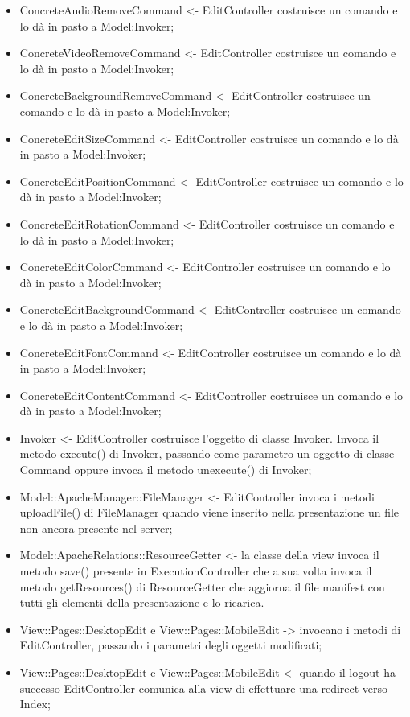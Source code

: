 {{\begin{itemize}
			\item ConcreteAudioRemoveCommand <- EditController costruisce un comando e lo dà in pasto a Model:Invoker;
			\item ConcreteVideoRemoveCommand <- EditController costruisce un comando e lo dà in pasto a Model:Invoker;
			\item ConcreteBackgroundRemoveCommand <- EditController costruisce un comando e lo dà in pasto a Model:Invoker;
			\item ConcreteEditSizeCommand <- EditController costruisce un comando e lo dà in pasto a Model:Invoker;
			\item ConcreteEditPositionCommand <- EditController costruisce un comando e lo dà in pasto a Model:Invoker;
			\item ConcreteEditRotationCommand <- EditController costruisce un comando e lo dà in pasto a Model:Invoker;
			\item ConcreteEditColorCommand <- EditController costruisce un comando e lo dà in pasto a Model:Invoker;
			\item ConcreteEditBackgroundCommand <- EditController costruisce un comando e lo dà in pasto a Model:Invoker;
			\item ConcreteEditFontCommand <- EditController costruisce un comando e lo dà in pasto a Model:Invoker;
			\item ConcreteEditContentCommand <- EditController costruisce un comando e lo dà in pasto a Model:Invoker;
			\item Invoker <- EditController costruisce l’oggetto di classe Invoker. Invoca il metodo execute() di Invoker, passando come parametro un oggetto di classe Command oppure invoca il metodo unexecute() di Invoker;
			\item Model::ApacheManager::FileManager <- EditController invoca i metodi uploadFile() di FileManager quando viene inserito nella presentazione un file non ancora presente nel server;
			\item Model::ApacheRelations::ResourceGetter <- la classe della view invoca il metodo save() presente in  ExecutionController che a sua volta invoca il metodo getResources() di ResourceGetter che aggiorna il file manifest con tutti gli elementi della presentazione e lo ricarica.
			\item View::Pages::DesktopEdit e View::Pages::MobileEdit -> invocano i metodi di EditController, passando i parametri degli oggetti modificati;
			\item View::Pages::DesktopEdit e View::Pages::MobileEdit <- quando il logout ha successo EditController comunica alla view di effettuare una redirect verso Index;

\end{itemize}}}
